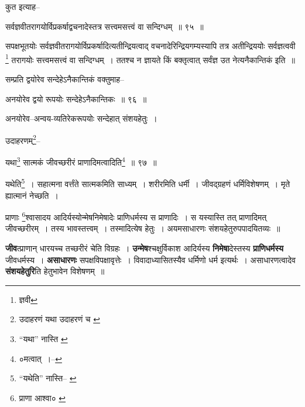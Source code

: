\documentclass[article,12pt,a4paper]{memoir}
\begin{document}
	  \pstart कुत इत्याह--
	\pend
       
	  \bigskip
	  \begingroup
	

	  \pstart सर्वज्ञवीतरागयोर्विप्रकर्षाद्वचनादेस्तत्र सत्त्वमसत्त्वं वा सन्दिग्धम् ॥ ९५ ॥
	\pend
      
	  \endgroup
	 

	  \pstart सपक्षभूतयोः सर्वज्ञवीतरागयोर्विप्रकर्षादित्यतीन्द्रियत्वाद् वचनादेरिन्द्रियगम्यस्यापि तत्र अतीन्द्रिययोः सर्वज्ञत्ववी \footnote{ज्ञवी} तरागयोः सत्त्वमसत्त्वं वा सन्दिग्धम् । ततश्च न ज्ञायते किं बक्तृत्वात् सर्वंज्ञ उत नेत्यनैकान्तिकं इति ॥
	\pend
       

	  \pstart सम्प्रति द्वयोरेव सन्देहेऽनैकान्तिकं वक्तुमाह--
	\pend
       
	  \bigskip
	  \begingroup
	

	  \pstart अनयोरेव द्वयो रूपयोः सन्देहेऽनैकान्तिकः ॥ ९६ ॥
	\pend
      
	  \endgroup
	 

	  \pstart अनयोरेव--अन्वय-व्यतिरेकरूपयोः सन्देहात् संशयहेतुः ।
	\pend
       

	  \pstart उदाहरणम्\footnote{उदाहरणं यथा \cite{dp-msD} उदाहरणं च \cite{dp-msC}}--
	\pend
       
	  \bigskip
	  \begingroup
	

	  \pstart यथा\footnote{“यथा” नास्ति \cite{dp-msB} \cite{dp-msC} \cite{dp-msD} \cite{dp-edP} \cite{dp-edH}} सात्मकं जीवच्छरीरं प्राणादिमत्वादिति\footnote{०मत्वात् ।--\cite{dp-msC}} ॥ ९७ ॥
	\pend
      
	  \endgroup
	 

	  \pstart यथेति\footnote{“यथेति” नास्ति--\cite{dp-msA} \cite{dp-msB} \cite{dp-msC} \cite{dp-msD} \cite{dp-edP} \cite{dp-edH} \cite{dp-edN}} । सहात्मना वर्त्तंते सात्मकमिति साध्यम् । शरीरमिति धर्मी । जीवद्ग्रहणं धर्मिविशेषणम् । मृते ह्यात्मानं नेच्छति ।
	\pend
       

	  \pstart प्राणाः \footnote{प्राणा आश्वा० \cite{dp-msA} \cite{dp-msB} \cite{dp-edP} \cite{dp-edH} \cite{dp-edE} \cite{dp-edN}}श्वासादय आदिर्यस्योन्मेषनिमेषादेः प्राणिधर्मस्य स प्राणादिः । स यस्यास्ति तत् प्राणादिमत् जीवच्छरीरम् । तस्य भावस्तत्त्वम् । तस्मादित्येष हेतुः । अयमसाधारणः संशयहेतुरुपपादयितव्यः ॥
	\pend
      
	  \endgroup
	

	  \pstart \textbf{जीव}त्प्राणान् धारयच्च तच्छरीरं चेति विग्रहः । \textbf{उन्मेष}श्चक्षुर्विकाश आदिर्यस्य \textbf{निमेषा}देस्तस्य \textbf{प्राणिधर्मस्य} जीवधर्मस्य । \textbf{असाधारणः} सपक्षविपक्षावृत्तेः । विवादाध्यासितस्यैव धर्मिणो धर्म इत्यर्थः । असाधारणत्वादेव \textbf{संशयहेतुरि}ति हेतुभावेन विशेषणम् ॥
	\pend
      \leavevmode{}
	  \bigskip
	  \begingroup
	
\end{document}
